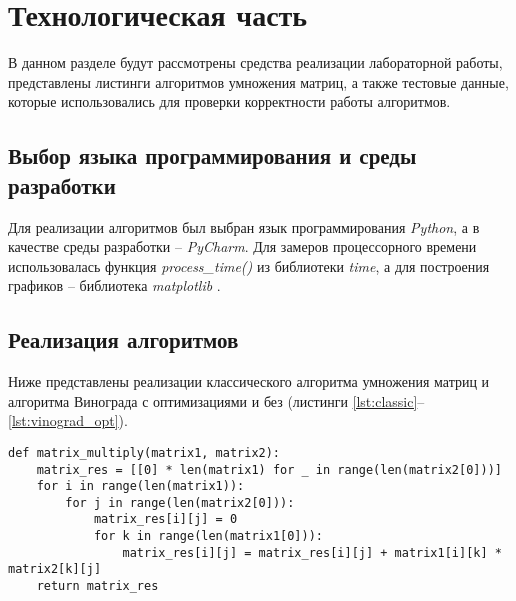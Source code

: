 \chapter{Технологическая часть}

В данном разделе будут рассмотрены средства реализации лабораторной работы, представлены листинги алгоритмов умножения матриц, а также тестовые данные, которые использовались для проверки корректности работы алгоритмов.


\section{Выбор языка программирования и среды разработки}
Для реализации алгоритмов был выбран язык программирования \textit{Python}, а в качестве среды разработки -- \textit{PyCharm}.
Для замеров процессорного времени использовалась функция \textit{process\_time()} \cite{time} из библиотеки \textit{time}, а для построения графиков -- библиотека \textit{matplotlib} \cite{mpl}.

\section{Реализация алгоритмов}
Ниже представлены реализации классического алгоритма умножения матриц и алгоритма Винограда с оптимизациями и без (листинги \ref{lst:classic}--\ref{lst:vinograd_opt}).

\begin{center}
\captionsetup{justification=raggedright,singlelinecheck=off}
\begin{lstlisting}[label=lst:classic,caption= Классический алгоритм умножения матриц]
def matrix_multiply(matrix1, matrix2):
    matrix_res = [[0] * len(matrix1) for _ in range(len(matrix2[0]))]
    for i in range(len(matrix1)):
        for j in range(len(matrix2[0])):
            matrix_res[i][j] = 0
            for k in range(len(matrix1[0])):
                matrix_res[i][j] = matrix_res[i][j] + matrix1[i][k] * matrix2[k][j]
    return matrix_res
\end{lstlisting}
\end{center}

